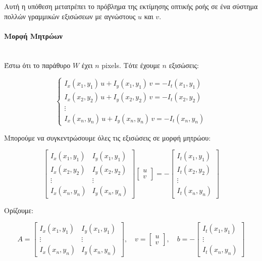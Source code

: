 \documentclass[12pt]{article}
\begin{document}
Αυτή η υπόθεση μετατρέπει το πρόβλημα της εκτίμησης οπτικής ροής σε ένα σύστημα πολλών γραμμικών εξισώσεων με αγνώστους \(u\) και \(v\).

\paragraph{Μορφή Μητρώων}
\mbox{}\\
Έστω ότι το παράθυρο \(W\) έχει \(n\) pixels. Τότε έχουμε \(n\) εξισώσεις:

\[
\begin{cases}
I_x(x_1,y_1)\, u + I_y(x_1,y_1)\, v = -I_t(x_1,y_1) \\
I_x(x_2,y_2)\, u + I_y(x_2,y_2)\, v = -I_t(x_2,y_2) \\
\vdots \\
I_x(x_n,y_n)\, u + I_y(x_n,y_n)\, v = -I_t(x_n,y_n)
\end{cases}
\]

Μπορούμε να συγκεντρώσουμε όλες τις εξισώσεις σε μορφή μητρώου:

\[
\begin{bmatrix}
I_x(x_1,y_1) & I_y(x_1,y_1) \\
I_x(x_2,y_2) & I_y(x_2,y_2) \\
\vdots & \vdots \\
I_x(x_n,y_n) & I_y(x_n,y_n)
\end{bmatrix}
\begin{bmatrix} u \\ v \end{bmatrix}
=
-
\begin{bmatrix}
I_t(x_1,y_1) \\
I_t(x_2,y_2) \\
\vdots \\
I_t(x_n,y_n)
\end{bmatrix}
\]

Ορίζουμε:

\[
A = 
\begin{bmatrix}
I_x(x_1,y_1) & I_y(x_1,y_1) \\
\vdots & \vdots \\
I_x(x_n,y_n) & I_y(x_n,y_n)
\end{bmatrix}, \quad
v = \begin{bmatrix} u \\ v \end{bmatrix}, \quad
b = - 
\begin{bmatrix}
I_t(x_1,y_1) \\
\vdots \\
I_t(x_n,y_n)
\end{bmatrix}
\]
\end{document}
